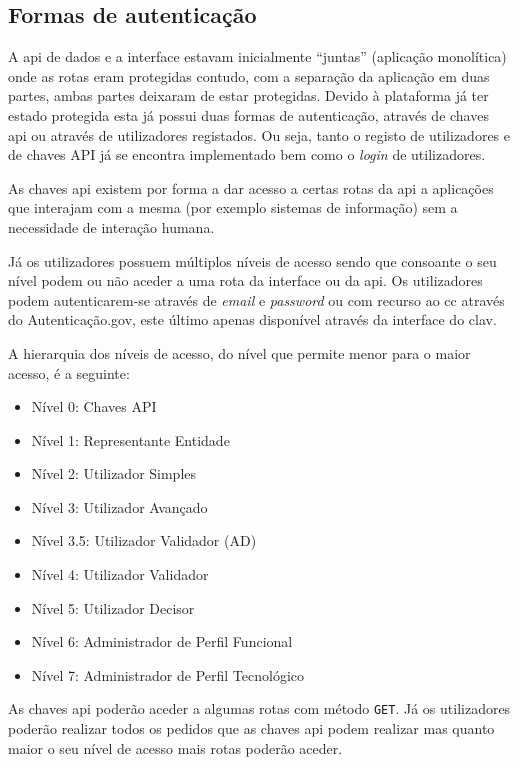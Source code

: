 \subsection{Formas de autenticação}\label{sec:autenticacao}
A \acrshort{api} de dados e a interface estavam inicialmente ``juntas'' (aplicação monolítica) onde as rotas eram protegidas contudo, com a separação da aplicação em duas partes, ambas partes deixaram de estar protegidas. Devido à plataforma já ter estado protegida esta já possui duas formas de autenticação, através de chaves \acrshort{api} ou através de utilizadores registados. Ou seja, tanto o registo de utilizadores e de chaves API já se encontra implementado bem como o \textit{login} de utilizadores.

As chaves \acrshort{api} existem por forma a dar acesso a certas rotas da \acrshort{api} a aplicações que interajam com a mesma (por exemplo sistemas de informação) sem a necessidade de interação humana.

Já os utilizadores possuem múltiplos níveis de acesso sendo que consoante o seu nível podem ou não aceder a uma rota da interface ou da \acrshort{api}. Os utilizadores podem autenticarem-se através de \textit{email} e \textit{password} ou com recurso ao \acrfull{cc} através do Autenticação.gov, este último apenas disponível através da interface do \acrshort{clav}.

A hierarquia dos níveis de acesso, do nível que permite menor para o maior acesso, é a seguinte:
\begin{itemize}
    \item Nível 0: Chaves API
    \item Nível 1: Representante Entidade
    \item Nível 2: Utilizador Simples
    \item Nível 3: Utilizador Avançado
    \item Nível 3.5: Utilizador Validador (AD)
    \item Nível 4: Utilizador Validador
    \item Nível 5: Utilizador Decisor
    \item Nível 6: Administrador de Perfil Funcional
    \item Nível 7: Administrador de Perfil Tecnológico
\end{itemize}

As chaves \acrshort{api} poderão aceder a algumas rotas com método \texttt{GET}.
Já os utilizadores poderão realizar todos os pedidos que as chaves \acrshort{api} podem realizar mas quanto maior o seu nível de acesso mais rotas poderão aceder.

